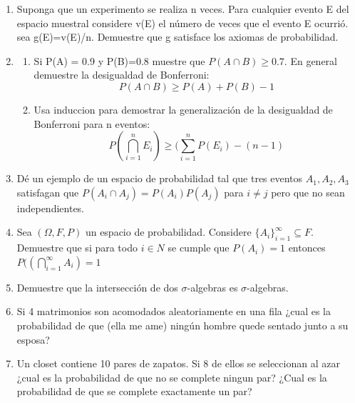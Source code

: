\documentclass[12pt,a4paper]{report}
\begin{document}
\begin{enumerate}
   \item {
   	Suponga que un experimento se realiza n veces. Para cualquier evento E del espacio muestral considere v(E) el número de veces que el evento E ocurrió. sea g(E)=v(E)/n. Demuestre que g satisface los axiomas de probabilidad.\\
	}

   \item {
  	\begin{enumerate}[label=\alph*) ]
   \item {
	Si P(A) = 0.9 y P(B)=0.8 muestre que $P(A \cap B) \geq 0.7$. En general demuestre la desigualdad de Bonferroni:\\
	$$P(A \cap B) \geq P(A)+P(B) -1$$
   }

   \item {
 Usa induccion para demostrar la generalización de la desigualdad de Bonferroni para n eventos:\\
 $$P(\bigcap\limits_{i=1}^{n} E_{i}) \geq (\sum_{i=1}^{n} P(E_{i})-(n-1)$$

   }




	\end{enumerate}
	}

  \item{
  Dé un ejemplo de un espacio de probabilidad tal que tres eventos $A_{1},A_{2},A_{3}$ satisfagan que $P(A_{i} \cap A_{j})=P(A_{i})P(A_{j})$ para $i\neq j$ pero que no sean independientes.
  }


  \item{
 Sea $(\Omega, F, P)$ un espacio de probabilidad. Considere $\lbrace A_{i} \rbrace_{i=1}^{\infty} \subseteq F$. Demuestre que si para todo $i \in N$ se cumple que $P(A_{i})=1$ entonces $P((\bigcap\limits_{i=1}^{\infty}A_{i})=1$
  }

  \item{
 Demuestre que la intersección de dos $\sigma$-algebras es $\sigma$-algebras.
  }


  \item{
Si 4 matrimonios son acomodados aleatoriamente en una fila ¿cual es la probabilidad de que (ella me ame) ningún hombre quede sentado junto a su esposa?
  }

  \item{
Un closet contiene 10 pares de zapatos. Si 8 de ellos se seleccionan al azar ¿cual es la probabilidad de que no se complete ningun par? ¿Cual es la probabilidad de que se complete exactamente un par?
  }


\end{enumerate}
\end{document}
